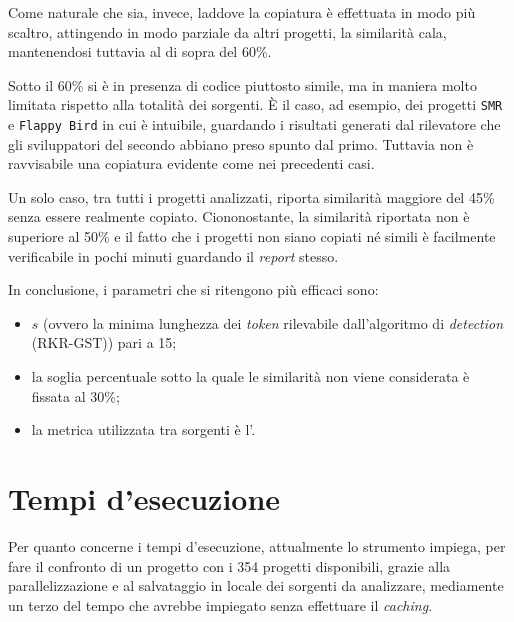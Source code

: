 Come naturale che sia, invece, laddove la copiatura è effettuata in modo più scaltro, attingendo in modo parziale da altri progetti, la similarità cala, mantenendosi tuttavia al di sopra del 60\%.

Sotto il 60\% si è in presenza di codice piuttosto simile, ma in maniera molto limitata rispetto alla totalità dei sorgenti.
%
\`E il caso, ad esempio, dei progetti \texttt{SMR} e \texttt{Flappy Bird} in cui è intuibile, guardando i risultati generati dal rilevatore che gli sviluppatori del secondo abbiano preso spunto dal primo.
%
Tuttavia non è ravvisabile una copiatura evidente come nei precedenti casi.

Un solo caso, tra tutti i progetti analizzati, riporta similarità maggiore del 45\% senza essere realmente copiato.
%
Ciononostante, la similarità riportata non è superiore al 50\% e il fatto che i progetti non siano copiati né simili è facilmente verificabile in pochi minuti guardando il \textit{report} stesso.

In conclusione, i parametri che si ritengono più efficaci sono: 

\begin{itemize}
    \item $s$ (ovvero la minima lunghezza dei \textit{token} rilevabile dall'algoritmo di \textit{detection} (RKR-GST)) pari a 15;
    \item la soglia percentuale sotto la quale le similarità non viene considerata è fissata al 30\%;
    \item la metrica utilizzata tra sorgenti è l'.
\end{itemize}

\section{Tempi d'esecuzione}
Per quanto concerne i tempi d'esecuzione, attualmente lo strumento impiega, per fare il confronto di un progetto con i 354 progetti disponibili, grazie alla parallelizzazione e al salvataggio in locale dei sorgenti da analizzare, mediamente un terzo del tempo che avrebbe impiegato senza effettuare il \textit{caching}.

